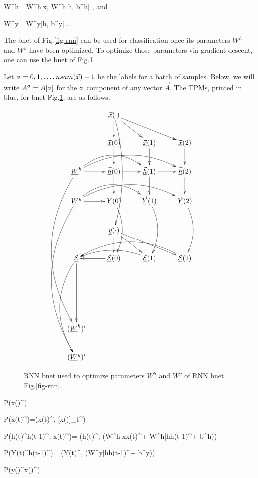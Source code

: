 \beq
W^h=[W^{h|x}, W^{h|h}, b^h]
\;,
\eeq
and

\beq
W^y=[W^{y|h}, b^y]
\;.
\eeq

The bnet of Fig.\ref{fig-rnn}
can be used for
classification once 
its parameters 
$W^h$ and $W^y$
have been optimized.
To optimize
those parameters via gradient
descent,
one can use the bnet 
of Fig.\ref{fig-rnn-ext}.

Let $\sigma=0,1, \ldots, nsam({\vec{x}})-1$
be the labels for a batch of samples.
Below, we will write $A^\sigma=A[\sigma]$
for the $\sigma$
component of any vector $\vec{A}$.
The TPMs,
 printed in blue,
for bnet Fig.\ref{fig-rnn-ext},
 are as follows.



\begin{figure}[h!]
\centering
$$\xymatrix{
&\ranvec{x}(\cdot)\ar[d]\ar[dr]\ar[drr]
\ar@/^1pc/[dddd]
\\
&\vec{\rvx}(0)\ar[d]&
\vec{\rvx}(1)\ar[d]&
\vec{\rvx}(2)\ar[d]\\
\rvW^h\ar[r]\ar@/^2pc/[rr]\ar@/^2pc/[rrr]
\ar@/_3pc/[dddddd]
&\vec{\rvh}(0)\ar[d]\ar[r]&
\vec{\rvh}(1)\ar[d]\ar[r]&
\vec{\rvh}(2)\ar[d]\\
\rvW^y\ar[r]\ar@/^2pc/[rr]\ar@/^2pc/[rrr]
\ar@/_3pc/[dddddd]
&\vec{\rvY}(0)\ar@/^1pc/[dd]&
\vec{\rvY}(1)\ar@/^1pc/[dd]&
\vec{\rvY}(2)\ar@/^1pc/[dd]
\\
&
\ranvec{y}(\cdot)\ar[d]\ar[dr]\ar[drr]
\\
\ul{\cale}\ar[ddd]
\ar@/_2pc/[dddd]&
\ul{\cale}(0)\ar[l]&
\ul{\cale}(1)\ar@/_1pc/[ll]&
\ul{\cale}(2)\ar@/_2pc/[lll]
\\
\\
\\
(\rvW^h)'\\
(\rvW^y)'
}
$$
\caption{RNN bnet used
to optimize parameters $W^h$
and $W^y$ of RNN bnet Fig.\ref{fig-rnn}.}
\label{fig-rnn-ext}
\end{figure}

\beq\color{blue}
P(x(\cdot)^\s)
\eeq

\beq\color{blue}
P(x(t)^\s)=\delta(x(t)^\s,
[x(\cdot)]_t^\s)
\eeq

\beq\color{blue}
P(h(t)^\s\mid h(t-1)^\s, x(t)^\s)=
\delta(h(t)^\s,
\phi(W^{h|x}x(t)^\s + W^{h|h}h(t-1)^\s + b^h))
\eeq

\beq\color{blue}
P(Y(t)^\s\mid h(t-1)^\s)=
\delta(Y(t)^\s,
\phi(W^{y|h}h(t-1)^\s + b^y))
\eeq

\beq\color{blue}
P(y(\cdot)^\s\mid x(\cdot)^\s)
\eeq

